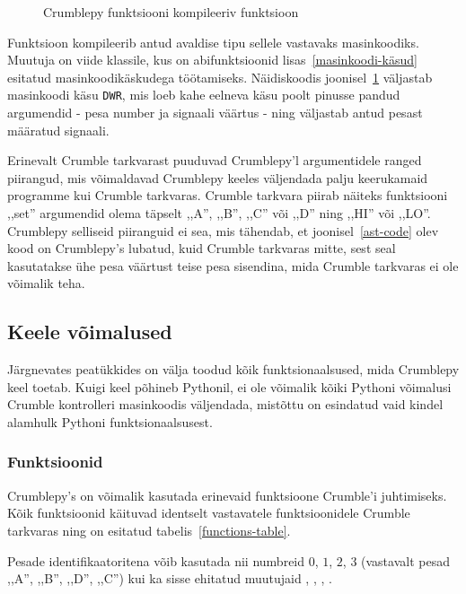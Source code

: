 \documentclass[12pt]{article}
\begin{document}
\begin{figure}[ht]
	\caption{Crumblepy funktsiooni  kompileeriv funktsioon}
	\label{set-output}
\end{figure}

Funktsioon  kompileerib antud avaldise tipu sellele vastavaks masinkoodiks. Muutuja  on viide  klassile, kus on abifunktsioonid lisas~\ref{masinkoodi-käsud} esitatud masinkoodikäskudega töötamiseks. Näidiskoodis joonisel~\ref{set-output} väljastab  masinkoodi käsu \texttt{DWR}, mis loeb kahe eelneva  käsu poolt pinusse pandud argumendid - pesa number ja signaali väärtus - ning väljastab antud pesast määratud signaali.

Erinevalt Crumble tarkvarast puuduvad Crumblepy'l argumentidele ranged piirangud, mis võimaldavad Crumblepy keeles väljendada palju keerukamaid programme kui Crumble tarkvaras. Crumble tarkvara piirab näiteks funktsiooni ,,set'' argumendid olema täpselt ,,A'', ,,B'', ,,C'' või ,,D'' ning ,,HI'' või ,,LO''. Crumblepy selliseid piiranguid ei sea, mis tähendab, et joonisel~\ref{ast-code} olev kood on Crumblepy's lubatud, kuid Crumble tarkvaras mitte, sest seal kasutatakse ühe pesa väärtust teise pesa sisendina, mida Crumble tarkvaras ei ole võimalik teha.

\subsection{Keele võimalused} \label{keele-võimalused}
Järgnevates peatükkides on välja toodud kõik funktsionaalsused, mida Crumblepy keel toetab. Kuigi keel põhineb Pythonil, ei ole võimalik kõiki Pythoni võimalusi Crumble kontrolleri masinkoodis väljendada, mistõttu on esindatud vaid kindel alamhulk Pythoni funktsionaalsusest.

\subsubsection{Funktsioonid}
Crumblepy's on võimalik kasutada erinevaid funktsioone Crumble'i juhtimiseks. Kõik funktsioonid käituvad identselt vastavatele funktsioonidele Crumble tarkvaras ning on esitatud tabelis~\ref{functions-table}.


Pesade identifikaatoritena võib kasutada nii numbreid $0$, $1$, $2$, $3$ (vastavalt pesad ,,A'', ,,B'', ,,D'', ,,C'') kui ka sisse ehitatud muutujaid , , , .
\end{document}
